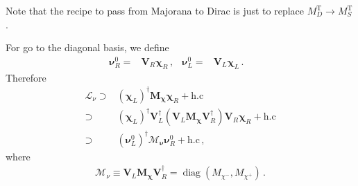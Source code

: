 \begin{frame}
Note that the recipe to pass from Majorana to Dirac is just to replace $M_D^{\operatorname{T}}\to M_S^{\operatorname{T}} $.

For go to the diagonal basis, we define
\begin{align}
  \boldsymbol{\nu}_R^0=& \boldsymbol{V}_R \boldsymbol{\chi}_R\,, &   \boldsymbol{\nu}_L^0=& \boldsymbol{V}_L \boldsymbol{\chi}_L\,. &
\end{align}
Therefore
\begin{align}
   \mathcal{L}_{\nu}\supset&\left( \boldsymbol{\chi}_L \right)^\dagger \boldsymbol{M_{\chi}} \boldsymbol{\chi}_R+\text{h.c} \nonumber\\
  \supset&\left( \boldsymbol{\chi}_L \right)^\dagger \boldsymbol{V}_L^{\dagger} \left( \boldsymbol{V}_L  \boldsymbol{M_{\chi}} \boldsymbol{V}_R^{\dagger} \right) \boldsymbol{V}_R \boldsymbol{\chi}_R+\text{h.c} \nonumber\\
          \supset&\left( \boldsymbol{\nu}_L^0 \right)^\dagger   \boldsymbol{\mathcal{M}_{\nu}}  \boldsymbol{\nu}_R^{0}+\text{h.c} \,,
\end{align}
where
\begin{align}
\boldsymbol{ \mathcal{M}}_{\nu}\equiv \boldsymbol{V}_L  \boldsymbol{M_{\chi}} \boldsymbol{V}_R^{\dagger}=\operatorname{diag}(M_{\chi^{-}},M_{\chi^{+}}  ) \,.
\end{align}


\end{frame}
